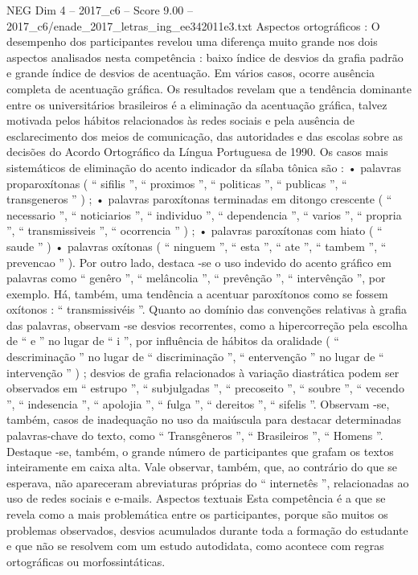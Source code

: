 \begin{textsample}{NEG Dim 4 – 2017\_c6 – Score 9.00 – 2017\_c6/enade\_2017\_letras\_ing\_ee342011e3.txt}
Aspectos ortográficos : O desempenho dos participantes revelou uma diferença muito grande nos dois aspectos analisados nesta competência : baixo índice de desvios da grafia padrão e grande índice de desvios de acentuação.
Em vários casos, ocorre ausência completa de acentuação gráfica.
Os resultados revelam que a tendência dominante entre os universitários brasileiros é a eliminação da acentuação gráfica, talvez motivada pelos hábitos relacionados às redes sociais e pela ausência de esclarecimento dos meios de comunicação, das autoridades e das escolas sobre as decisões do Acordo Ortográfico da Língua Portuguesa de 1990.
Os casos mais sistemáticos de eliminação do acento indicador da sílaba tônica são : • palavras proparoxítonas ( “ sifilis ”, “ proximos ”, “ politicas ”, “ publicas ”, “ transgeneros ” ) ; • palavras paroxítonas terminadas em ditongo crescente ( “ necessario ”, “ noticiarios ”, “ individuo ”, “ dependencia ”, “ varios ”, “ propria ”, “ transmissiveis ”, “ ocorrencia ” ) ; • palavras paroxítonas com hiato ( “ saude ” ) • palavras oxítonas ( “ ninguem ”, “ esta ”, “ ate ”, “ tambem ”, “ prevencao ” ).
Por outro lado, destaca -se o uso indevido do acento gráfico em palavras como “ genêro ”, “ melâncolia ”, “ prevênção ”, “ intervênção ”, por exemplo.
Há, também, uma tendência a acentuar paroxítonos como se fossem oxítonos : “ transmissivéis ”.
Quanto ao domínio das convenções relativas à grafia das palavras, observam -se desvios recorrentes, como a hipercorreção pela escolha de “ e ” no lugar de “ i ”, por influência de hábitos da oralidade ( “ descriminação ” no lugar de “ discriminação ”, “ entervenção ” no lugar de “ intervenção ” ) ; desvios de grafia relacionados à variação diastrática podem ser observados em “ estrupo ”, “ subjulgadas ”, “ precoseito ”, “ soubre ”, “ vecendo ”, “ indesencia ”, “ apolojia ”, “ fulga ”, “ dereitos ”, “ sifelis ”.
Observam -se, também, casos de inadequação no uso da maiúscula para destacar determinadas palavras-chave do texto, como “ Transgêneros ”, “ Brasileiros ”, “ Homens ”.
Destaque -se, também, o grande número de participantes que grafam os textos inteiramente em caixa alta.
Vale observar, também, que, ao contrário do que se esperava, não apareceram abreviaturas próprias do “ internetês ”, relacionadas ao uso de redes sociais e e-mails.
Aspectos textuais Esta competência é a que se revela como a mais problemática entre os participantes, porque são muitos os problemas observados, desvios acumulados durante toda a formação do estudante e que não se resolvem com um estudo autodidata, como acontece com regras ortográficas ou morfossintáticas.

\end{textsample}
